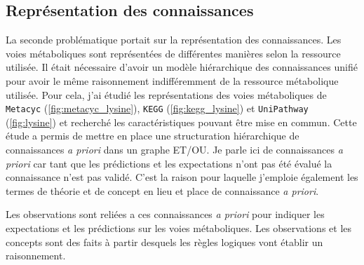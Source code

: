 \begin{refsegment}
\subsection{Représentation des connaissances}

La seconde problématique portait sur la représentation des connaissances. Les voies métaboliques sont représentées de différentes manières selon la ressource utilisée. Il était nécessaire d'avoir un modèle hiérarchique des connaissances unifié pour avoir le même raisonnement indifféremment de la ressource métabolique utilisée. Pour cela, j'ai étudié les représentations des voies métaboliques de \texttt{Metacyc} (\cref{fig:metacyc_lysine}), \texttt{KEGG} (\cref{fig:kegg_lysine}) et \texttt{UniPathway} (\cref{fig:lysine}) et recherché les caractéristiques pouvant être mise en commun. Cette étude a permis de mettre en place une structuration hiérarchique de connaissances \textit{a priori} dans un graphe ET/OU. Je parle ici de connaissances \textit{a priori} car tant que les prédictions et les expectations n'ont pas été évalué la connaissance n'est pas validé. C'est la raison pour laquelle j'emploie également les termes de théorie et de concept en lieu et place de connaissance \textit{a priori}. 

Les observations sont reliées a ces connaissances \textit{a priori} pour indiquer les expectations et les prédictions sur les voies métaboliques. Les observations et les concepts sont des faits à partir desquels les règles logiques vont établir un raisonnement. 


\end{refsegment}
